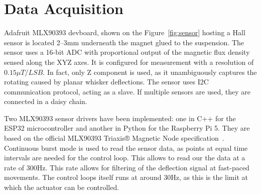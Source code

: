 \section{Data Acquisition}

Adafruit MLX90393 devboard, shown on the Figure~\cref{fig:sensor} hosting a Hall sensor is located 2--3mm underneath the magnet glued to the suspension.
The sensor uses a 16-bit ADC with proportional output of the magnetic flux density sensed along the XYZ axes.
It is configured for measurement with a resolution of \(0.15 \mu T/LSB\).
In fact, only Z component is used, as it unambiguously captures the rotating caused by planar whisker deflections.
The sensor uses I2C communication protocol, acting as a slave.
If multiple sensors are used, they are connected in a daisy chain.

Two MLX90393 sensor drivers have been implemented: one in C++ for the ESP32 microcontroller and another in Python for the Raspberry Pi 5.
They are based on the official MLX90393 Triaxis® Magnetic Node specification~\cite{MLX90393}.
Continuous burst mode is used to read the sensor data, as points at equal time intervals are needed for the control loop.
This allows to read our the data at a rate of 300Hz.
This rate allows for filtering of the deflection signal at fast-paced movements.
The control loops itself runs at around 30Hz, as this is the limit at which the actuator can be controlled.


